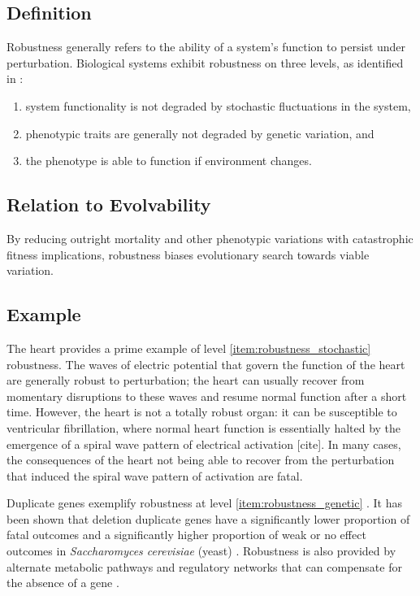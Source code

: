 \subsection{Definition}
Robustness generally refers to the ability of a system's function to persist under perturbation. Biological systems exhibit robustness on three levels, as identified in \cite{Richter2015EvolvabilitySurvey}:
\begin{enumerate}
    \item system functionality is not degraded by stochastic fluctuations in the system, \label{item:robustness_stochastic}
  	\item phenotypic traits are generally not degraded by genetic variation, and \label{item:robustness_genetic}
    \item the phenotype is able to function if environment changes. \label{item:robustness_environment}
\end{enumerate}

\subsection{Relation to Evolvability}
By reducing outright mortality and other phenotypic variations with catastrophic fitness implications, robustness biases evolutionary search towards viable variation.

\subsection{Example}
The heart provides a prime example of level \ref{item:robustness_stochastic} robustness. The waves of electric potential that govern the function of the heart are generally robust to perturbation; the heart can usually recover from momentary disruptions to these waves and resume normal function after a short time. However, the heart is not a totally robust organ: it can be susceptible to ventricular fibrillation, where normal heart function is essentially halted by the emergence of a spiral wave pattern of electrical activation [cite]. In many cases, the consequences of the heart not being able to recover from the perturbation that induced the spiral wave pattern of activation are fatal.

Duplicate genes exemplify robustness at level \ref{item:robustness_genetic} \cite{Gu2003EvolutionMutations}. It has been shown that deletion duplicate genes have a significantly lower proportion of fatal outcomes and a significantly higher proportion of weak or no effect outcomes in \textit{Saccharomyces cerevisiae} (yeast) \cite{Gu2003EvolutionMutations}. Robustness is also provided by alternate metabolic pathways and regulatory networks that can compensate for the absence of a gene \cite{Gu2003EvolutionMutations}.

